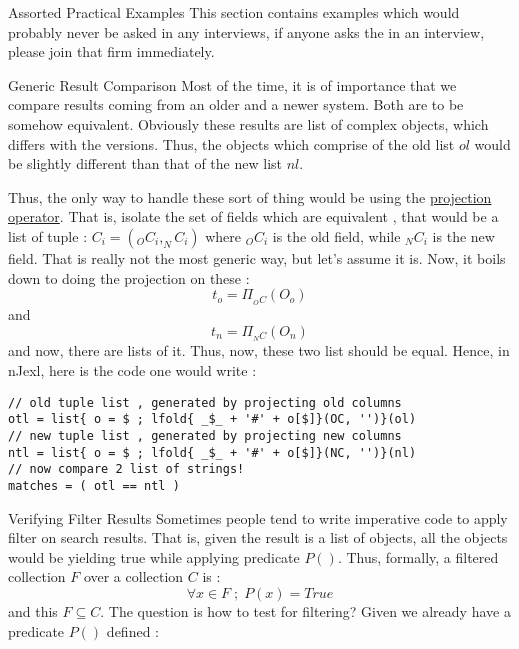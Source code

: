 \begin{section}{Assorted Practical Examples}
This section contains examples which would probably never be asked in any interviews,
if anyone asks the in an interview, please join that firm immediately.

\begin{subsection}{Generic Result Comparison}
Most of the time, it is of importance that we compare results coming from an 
older and a newer system. Both are to be somehow equivalent.
Obviously these results are list of complex objects, which differs with the versions.
Thus, the objects which comprise of the old list $ol$ would be slightly different 
than that of the new list $nl$. 

Thus, the only way to handle these sort of thing would be using the 
\href{https://en.wikipedia.org/wiki/Projection\_(relational\_algebra)}{projection operator}.
That is, isolate the set of fields which are equivalent , that would be a list of tuple :
$C_i = ( _OC_i,_NC_i )$ where $_OC_i$ is the old field, while $_NC_i$ is the new field.
That is really not the most generic way, but let's assume it is.
Now, it boils down to doing the projection on these :
$$
t_o = \Pi_{ _OC }(O_o) 
$$ 
and
$$
t_n = \Pi_{ _NC }(O_n)
$$ 
and now, there are lists of it. Thus, now, these two list should be equal.
Hence, in nJexl, here is the code one would write :

\begin{center}\begin{minipage}{\linewidth}
\begin{lstlisting}[style=JexlStyle]
// old tuple list , generated by projecting old columns 
otl = list{ o = $ ; lfold{ _$_ + '#' + o[$]}(OC, '')}(ol)
// new tuple list , generated by projecting new columns 
ntl = list{ o = $ ; lfold{ _$_ + '#' + o[$]}(NC, '')}(nl)
// now compare 2 list of strings!
matches = ( otl == ntl )  
\end{lstlisting}  
\end{minipage}\end{center}
\end{subsection}

\begin{subsection}{Verifying Filter Results}
Sometimes people tend to write imperative code to apply filter on search results.
That is, given the result is a list of objects, all the objects would be yielding true
while applying predicate $P()$. Thus, formally, a filtered collection $F$ over a collection $C$ is :
$$
\forall x \in F \; ; \; P(x)  = True 
$$
and this $F \subseteq C$. The question is how to test for filtering?
Given we already have a predicate $P()$ defined :
 

\end{subsection}
\end{section}
